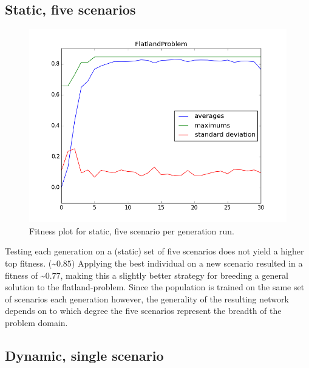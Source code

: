 \documentclass[twoside]{article}
\begin{document}
\begin{multicols}{2}
  \subsection{Static, five scenarios}

  \begin{figure}[H]
    \centering
    \includegraphics[width=\linewidth]{images/static_5.png}
    \caption{Fitness plot for static, five scenario per generation run.} \label{fig:static-single}
  \end{figure}

  Testing each generation on a (static) set of five scenarios does not yield a higher top fitness. (\textasciitilde $0.85$)
  Applying the best individual on a new scenario resulted in a fitness of \textasciitilde $0.77$, making this a slightly better strategy for breeding a general solution to the flatland-problem.
  Since the population is trained on the same set of scenarios each generation however, the generality of the resulting network depends on to which degree the five scenarios represent the breadth of the problem domain.

  \subsection{Dynamic, single scenario}
  

\end{multicols}
\end{document}
